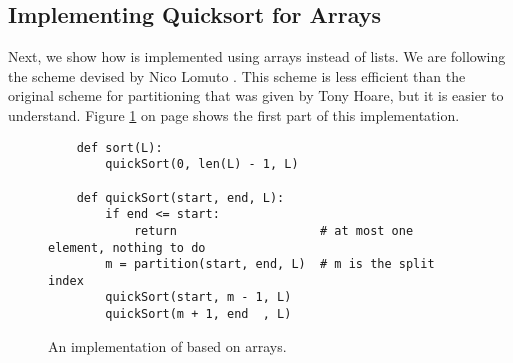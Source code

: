 \subsection{Implementing Quicksort for Arrays}
Next, we show how   is implemented using arrays instead of lists.  We are following the scheme
devised by Nico Lomuto \cite{cormen:09}.   This scheme is less efficient than the original
scheme for partitioning that was given by Tony Hoare, but it is easier to understand.
Figure \ref{fig:quick-sort-array.stlx} on page \pageref{fig:quick-sort-array.stlx} shows the first part of this
implementation.  

\begin{figure}[!ht]
  \centering
\begin{verbatim}
    def sort(L):
        quickSort(0, len(L) - 1, L)
    
    def quickSort(start, end, L):
        if end <= start:
            return                    # at most one element, nothing to do
        m = partition(start, end, L)  # m is the split index
        quickSort(start, m - 1, L)
        quickSort(m + 1, end  , L)
\end{verbatim}
\vspace*{-0.3cm}
  \caption{An implementation of  based on arrays.}
  \label{fig:quick-sort-array.stlx}
\end{figure}

